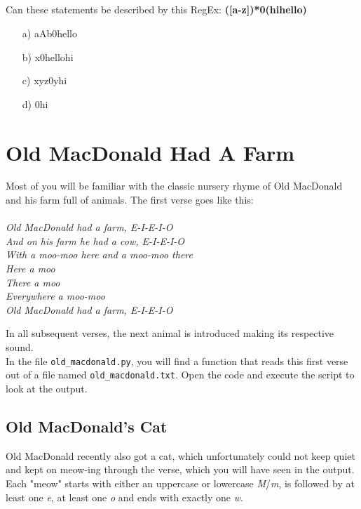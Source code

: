 \subsection{}
Can these statements be described by this RegEx: \textbf{([a-z]\textbar [A-Z])*0(hi\textbar hello)}
\begin{itemize}
\item[a)] aAb0hello 
\item[b)] x0hellohi 
\item[c)] xyz0yhi 
\item[d)] 0hi 
\end{itemize}


\section{Old MacDonald Had A Farm}
Most of you will be familiar with the classic nursery rhyme of Old MacDonald and his farm full of animals. The first verse goes like this:\\\\
\textit{Old MacDonald had a farm, E-I-E-I-O\\
And on his farm he had a cow, E-I-E-I-O\\
With a moo-moo here and a moo-moo there\\
Here a moo\\
There a moo\\
Everywhere a moo-moo\\
Old MacDonald had a farm, E-I-E-I-O\\
}

\noindent In all subsequent verses, the next animal is introduced making its respective sound.\\
In the file \texttt{old\_macdonald.py}, you will find a function that reads this first verse out of a file named \texttt{old\_macdonald.txt}. Open the code and execute the script to look at the output.

\subsection{Old MacDonald's Cat}
Old MacDonald recently also got a cat, which unfortunately could not keep quiet and kept on meow-ing through the verse, which you will have seen in the output.\\
Each "meow" starts with either an uppercase or lowercase \textit{M}/\textit{m}, is followed by at least one \textit{e}, at least one \textit{o} and ends with exactly one \textit{w}.\\


